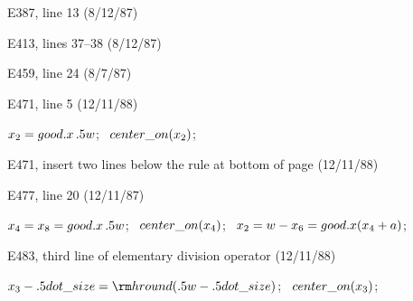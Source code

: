 \ninepoint
{}

\bugonpage E387, line 13 (8/12/87)

\ninepoint
{}

\bugonpage E413, lines 37--38 (8/12/87)

\ninepoint
{}

\bugonpage E459, line 24 (8/7/87)

\ninepoint\noindent[Delete the `$=$' sign between `\\{lft}' and `$x_5$'.]

\bugonpage E471, line 5 (12/11/88)

\ninepoint\noindent
$x_2=\\{good}.x\,.5w$; \ $\\{center\_on}(x_2)$;

\bugonpage E471, insert two lines below the rule at bottom of page (12/11/88)

\ninepoint
{}

\bugonpage E477, line 20 (12/11/87)

\ninepoint\noindent
$x_4=x_8=\\{good}.x\,.5w$; \ $\\{center\_on}(x_4)$; \
$x_2=w-x_6=\\{good}.x(x_4+a)$;

\bugonpage E483, third line of elementary division operator (12/11/88)

\ninepoint\noindent
$x_3-.5\\{dot\_size}={\rm hround}(.5w-.5\\{dot\_size})$; \
$\\{center\_on}(x_3)$;

